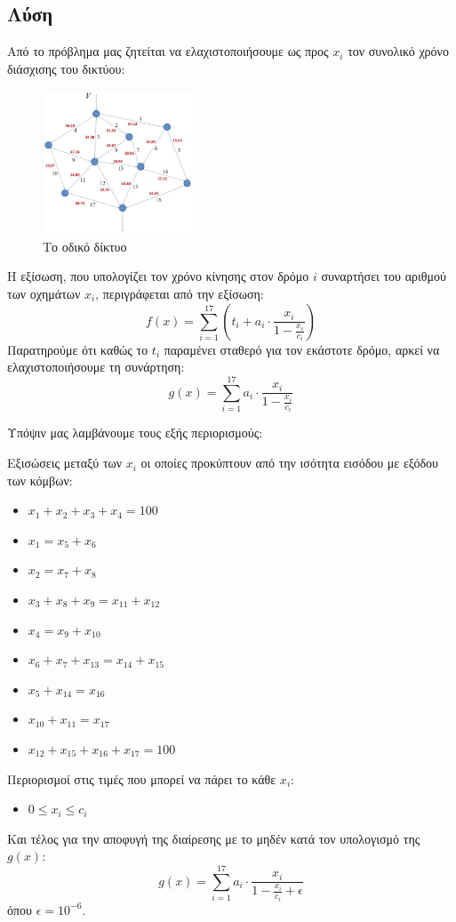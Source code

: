 \documentclass[twocolumn]{report}
\begin{document}
\subsection*{Λύση}
Από το πρόβλημα μας ζητείται να ελαχιστοποιήσουμε ως προς $x_i$ τον συνολικό
χρόνο διάσχισης του δικτύου:
\begin{figure}[H]
    \centering
    \includegraphics[width=0.4\textwidth]{media/network.png}
    \caption{Το οδικό δίκτυο}
\end{figure}

Η εξίσωση, που υπολογίζει τον χρόνο κίνησης στον δρόμο $i$ συναρτήσει του αριθμού 
των οχημάτων $x_i$, περιγράφεται από την εξίσωση:
$$f(x) = \sum_{i=1}^{17} \left( t_i + a_i \cdot \frac{x_i}{1 - \frac{x_i}{c_i}} \right)$$
Παρατηρούμε ότι καθώς το $t_i$ παραμένει σταθερό για τον εκάστοτε δρόμο, αρκεί 
να ελαχιστοποιήσουμε τη συνάρτηση:
$$g(x) = \sum_{i=1}^{17} a_i \cdot \frac{x_i}{1 - \frac{x_i}{c_i}}$$

Υπόψιν μας λαμβάνουμε τους εξής περιορισμούς:

\smallskip 

Εξισώσεις μεταξύ των $x_i$ οι οποίες προκύπτουν από την ισότητα εισόδου με εξόδου
των κόμβων:
\begin{itemize}
    \item $x_1 + x_2 + x_3 + x_4 = 100$
    \item $x_1 = x_5 + x_6$
    \item $x_2 = x_7 + x_8$
    \item $x_3 + x_8 + x_9 = x_{11} + x_{12}$
    \item $x_4 = x_9 + x_{10}$
    \item $x_6 + x_7 + x_{13} = x_{14} + x_{15}$
    \item $x_5 + x_{14} = x_{16}$
    \item $x_{10} + x_{11} = x_{17}$
    \item $x_{12} + x_{15} + x_{16} + x_{17} = 100$
\end{itemize}
Περιορισμοί στις τιμές που μπορεί να πάρει το κάθε $x_i$:
\begin{itemize}
    \item $0 \leq x_i \leq c_i$
\end{itemize}
Και τέλος για την αποφυγή της διαίρεσης με το μηδέν κατά τον υπολογισμό της $g(x)$:
$$g(x) = \sum_{i=1}^{17} a_i \cdot \frac{x_i}{1 - \frac{x_i}{c_i}+ \epsilon}$$
όπου $\epsilon = 10^{-6}$.
\end{document}

